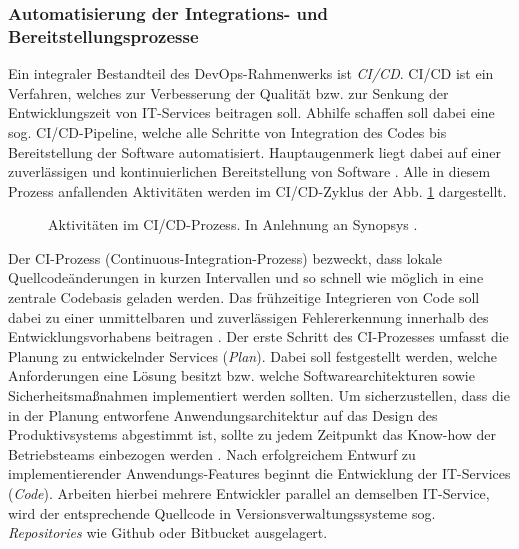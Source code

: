 \subsubsection{Automatisierung der Integrations- und Bereitstellungsprozesse}
\label{sec:CICD}
 Ein integraler Bestandteil des DevOps-Rahmen\-werks ist \textit{\ac{CI/CD}}. CI/CD ist ein Verfahren, welches zur Verbesserung der Qualität bzw. zur Senkung der Entwicklungszeit von IT-Services beitragen soll. Abhilfe schaffen soll dabei eine sog. CI/CD-Pipeline, welche alle Schritte von Integration des Codes  bis Bereitstellung der Software automatisiert. Hauptaugenmerk liegt dabei auf einer zuverlässigen und kontinuierlichen Bereitstellung von Software \cite[471]{Zampetti.92720211012021}. Alle in diesem Prozess anfallenden Aktivitäten werden im CI/CD-Zyklus der Abb. \ref{fig:CICD_Cycle} dargestellt. 
 \begin{center}
	\begin{figure}[H]
		\centering
		\captionsetup{format=myformat}
		\caption[Aktivitäten im CI/CD-Prozess]{Aktivitäten im CI/CD-Prozess. In Anlehnung an Synopsys \cite{.20230201}.}
		\label{fig:CICD_Cycle}
	\end{figure}
\end{center}
\vspace*{-15mm}
Der \acs{CI}-Prozess (Continuous-Integration-Prozess) bezweckt, dass lokale Quellcode\-änderungen in kurzen Intervallen und so schnell wie möglich in eine zentrale Codebasis geladen werden. Das frühzeitige Integrieren von Code soll dabei zu einer unmittelbaren und zuverlässigen Fehlererkennung innerhalb des Entwicklungsvorhabens beitragen \cite[471]{Zampetti.92720211012021}. 
Der erste Schritt des CI-Prozesses umfasst die Planung zu entwickelnder Services (\textit{Plan}). Dabei soll festgestellt werden, welche Anforderungen eine Lösung besitzt bzw. welche Softwarearchitekturen sowie Sicherheitsmaßnahmen implementiert werden sollten. Um sicherzustellen, dass die in der Planung entworfene Anwendungsarchitektur auf das Design des Produktivsystems abgestimmt ist, sollte zu jedem Zeitpunkt das Know-how der Betriebsteams einbezogen werden \cite[16]{Halstenberg.2020}. Nach erfolgreichem Entwurf zu implementierender Anwendungs-Features beginnt die Entwicklung der IT-Services (\textit{Code}). Arbeiten hierbei mehrere Entwickler parallel an demselben IT-Service, wird der entsprechende Quellcode in Versionsverwaltungssysteme sog. \textit{Repositories} wie Github oder Bitbucket ausgelagert.

